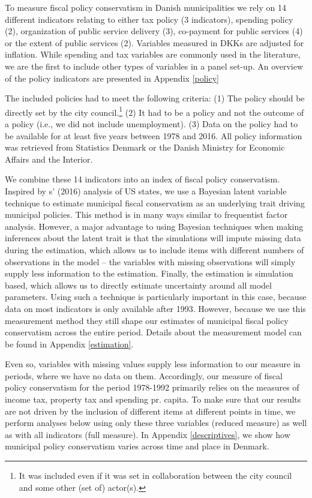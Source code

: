 \documentclass[a4paper,12pt]{article}
\begin{document}
To measure fiscal policy conservatism in Danish municipalities we rely on 14 different indicators relating to either tax policy (3 indicators), spending policy (2), organization of public service delivery (3), co-payment for public services (4) or the extent of public services (2). Variables measured in DKKs are adjusted for inflation. While  spending and tax variables are commonly used in the literature, we are the first to include other types of variables in a panel set-up. An overview of the policy indicators are presented in Appendix \ref{policy}

The included policies had to meet the following criteria: (1) The policy should be directly set by the city council.\footnote{It was included even if it was set in collaboration between the city council and some other (set of) actor(s).} (2) It had to be a policy and not the outcome of a policy (i.e., we did not include unemployment). (3) Data on the policy had to be available for at least five years between 1978 and 2016. All policy information was retrieved from Statistics Denmark or the Danish Ministry for Economic Affairs and the Interior.

We combine these 14 indicators into an index of fiscal policy conservatism. Inspired by \citeauthor{caughey2016dynamics}s' (2016) analysis of US states, we use a Bayesian latent variable technique to estimate municipal fiscal conservatism as an underlying trait driving municipal policies.  This method is in many ways similar to frequentist factor analysis. However, a major advantage to using Bayesian techniques when making inferences about the latent trait is that the simulations will impute missing data during the estimation, which allows us to include items with different numbers of observations in the model -- the variables with missing observations will simply supply less information to the estimation. Finally, the estimation is simulation based, which allows us to directly estimate uncertainty around all model parameters. Using such a technique is particularly important in this case, because data on most indicators is only available after 1993. However, because we use this measurement method they still shape our estimates of municipal fiscal policy conservatism across the entire period. Details about the measurement model can be found in Appendix \ref{estimation}. 

Even so, variables with missing values supply less information to our measure in periods, where we have no data on them. Accordingly, our measure of fiscal policy conservatism for the period 1978-1992 primarily relies on the measures of income tax, property tax and spending pr. capita. To make sure that our results are not driven by the inclusion of different items at different points in time, we perform analyses below using only these three variables (reduced measure) as well as with all indicators (full measure). In Appendix \ref{descriptives}, we show how municipal policy conservatism varies across time and place in Denmark.
\end{document}
